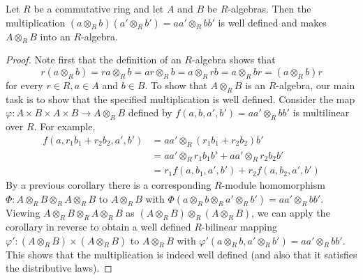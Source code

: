 \documentclass[12pt, a4paper, oneside, openright, titlepage]{book}
\begin{document}
\begin{prop}
    Let $R$ be a commutative ring and let $A$ and $B$ be $R$-algebras. Then the multiplication $(a\otimes_Rb)(a'\otimes_Rb') = aa'\otimes_Rbb'$ is well defined and makes $A\otimes_RB$ into an $R$-algebra.
\end{prop}
\begin{proof}
    Note first that the definition of an $R$-algebra shows that \begin{equation*}
        r(a\otimes_Rb) = ra\otimes_Rb = ar\otimes_Rb = a\otimes_Rrb = a\otimes_Rbr = (a\otimes_Rb)r
    \end{equation*}
    for every $r \in R,a \in A$ and $b \in B$. To show that $A\otimes_RB$ is an $R$-algebra, our main task is to show that the specified multiplication is well defined. Consider the map $\varphi:A\times B\times A \times B\rightarrow A\otimes_RB$ defined by $f(a,b,a',b') = aa'\otimes_Rbb'$ is multilinear over $R$. For example, \begin{align*}
        f(a,r_1b_1+r_2b_2,a',b') &= aa'\otimes_R(r_1b_1+r_2b_2)b' \\
        &= aa'\otimes_Rr_1b_1b' + aa'\otimes_Rr_2b_2b' \\
        &= r_1f(a,b_1,a',b')+r_2f(a,b_2,a',b')
    \end{align*}
    By a previous corollary there is a corresponding $R$-module homomorphism $\Phi:A\otimes_RB\otimes_RA\otimes_RB$ to $A\otimes_RB$ with $\Phi(a\otimes_Rb\otimes_Ra'\otimes_Rb') = aa'\otimes_Rbb'$. Viewing $A\otimes_RB\otimes_RA\otimes_RB$ as $(A\otimes_RB)\otimes_R(A\otimes_RB)$, we can apply the corollary in reverse to obtain a well defined $R$-bilinear mapping $\varphi':(A\otimes_RB)\times(A\otimes_RB)$ to $A\otimes_RB$ with $\varphi'(a\otimes_Rb,a'\otimes_Rb') = aa'\otimes_Rbb'$. This shows that the multiplication is indeed well defined (and also that it satisfies the distributive laws).
\end{proof}
\end{document}
